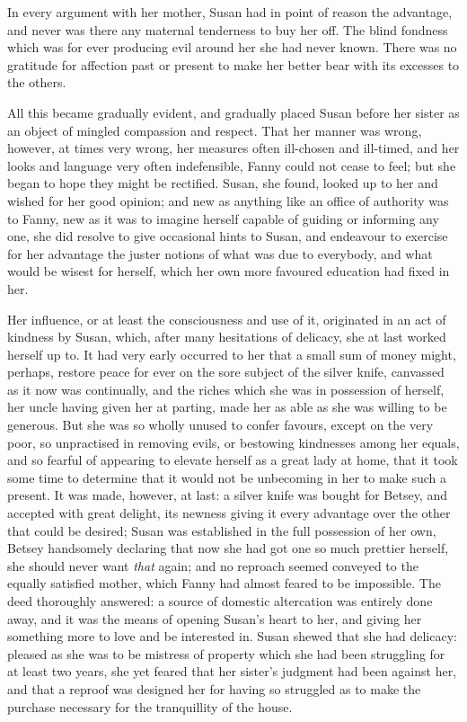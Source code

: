 In every argument with her mother, Susan had in point of reason the advantage, and never was there any maternal tenderness to buy her off. The blind fondness which was for ever producing evil around her she had never known. There was no gratitude for affection past or present to make her better bear with its excesses to the others.

All this became gradually evident, and gradually placed Susan before her sister as an object of mingled compassion and respect. That her manner was wrong, however, at times very wrong, her measures often ill-chosen and ill-timed, and her looks and language very often indefensible, Fanny could not cease to feel; but she began to hope they might be rectified. Susan, she found, looked up to her and wished for her good opinion; and new as anything like an office of authority was to Fanny, new as it was to imagine herself capable of guiding or informing any one, she did resolve to give occasional hints to Susan, and endeavour to exercise for her advantage the juster notions of what was due to everybody, and what would be wisest for herself, which her own more favoured education had fixed in her.

Her influence, or at least the consciousness and use of it, originated in an act of kindness by Susan, which, after many hesitations of delicacy, she at last worked herself up to. It had very early occurred to her that a small sum of money might, perhaps, restore peace for ever on the sore subject of the silver knife, canvassed as it now was continually, and the riches which she was in possession of herself, her uncle having given her  at parting, made her as able as she was willing to be generous. But she was so wholly unused to confer favours, except on the very poor, so unpractised in removing evils, or bestowing kindnesses among her equals, and so fearful of appearing to elevate herself as a great lady at home, that it took some time to determine that it would not be unbecoming in her to make such a present. It was made, however, at last: a silver knife was bought for Betsey, and accepted with great delight, its newness giving it every advantage over the other that could be desired; Susan was established in the full possession of her own, Betsey handsomely declaring that now she had got one so much prettier herself, she should never want \textit{that}  again; and no reproach seemed conveyed to the equally satisfied mother, which Fanny had almost feared to be impossible. The deed thoroughly answered: a source of domestic altercation was entirely done away, and it was the means of opening Susan's heart to her, and giving her something more to love and be interested in. Susan shewed that she had delicacy: pleased as she was to be mistress of property which she had been struggling for at least two years, she yet feared that her sister's judgment had been against her, and that a reproof was designed her for having so struggled as to make the purchase necessary for the tranquillity of the house.

